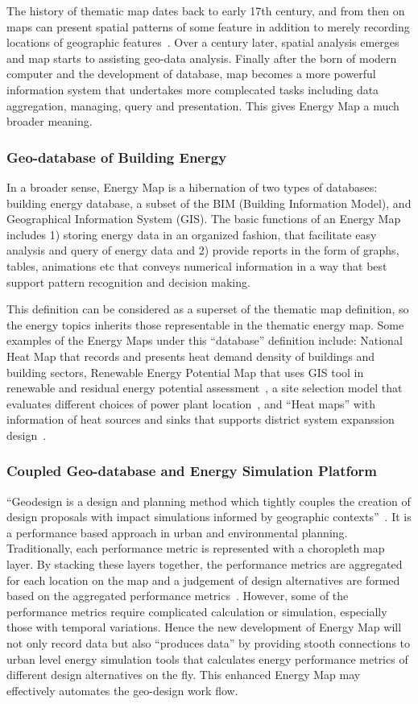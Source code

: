 \documentclass[hidelinks,12pt]{article}
\begin{document}
The history of thematic map dates back to early 17th century, and from
then on maps can present spatial patterns of some feature in addition
to merely recording locations of geographic
features~\cite{ThematicMap}. Over a century later, spatial analysis
emerges and map starts to assisting geo-data analysis. Finally after
the born of modern computer and the development of database, map
becomes a more powerful information system that undertakes more
complecated tasks including data aggregation, managing, query and
presentation. This gives Energy Map a much broader meaning.

\subsubsection{Geo-database of Building Energy}
In a broader sense, Energy Map is a hibernation of two types of
databases: building energy database, a subset of the BIM (Building
Information Model), and Geographical Information System (GIS). The
basic functions of an Energy Map includes 1) storing energy data in an
organized fashion, that facilitate easy analysis and query of energy
data and 2) provide reports in the form of graphs, tables, animations
etc that conveys numerical information in a way that best support
pattern recognition and decision making. 

This definition can be considered as a superset of the thematic map
definition, so the energy topics inherits those representable in the
thematic energy map. Some examples of the Energy Maps under this
``database'' definition include: National Heat Map that records and
presents heat demand density of buildings and building sectors,
Renewable Energy Potential Map that uses GIS tool in renewable and
residual energy potential assessment~\cite{Voivontas1998333}, a site
selection model that evaluates different choices of power plant
location~\cite{Yeo201499}, and ``Heat maps'' with information of heat
sources and sinks that supports district system expanssion
design~\cite{Finney2012165}.

\subsubsection{Coupled Geo-database and Energy Simulation Platform}
``Geodesign is a design and planning method which tightly couples the
creation of design proposals with impact simulations informed by
geographic contexts''~\cite{Flaxman2010}. It is a performance based
approach in urban and environmental planning. Traditionally, each
performance metric is represented with a choropleth map layer. By
stacking these layers together, the performance metrics are aggregated
for each location on the map and a judgement of design alternatives
are formed based on the aggregated performance
metrics~\cite{CPcp66-goodchild}. However, some of the performance
metrics require complicated calculation or simulation, especially
those with temporal variations. Hence the new development of Energy
Map will not only record data but also ``produces data'' by providing
stooth connections to urban level energy simulation tools that
calculates energy performance metrics of different design alternatives
on the fly. This enhanced Energy Map may effectively automates
the geo-design work flow.
\end{document}
